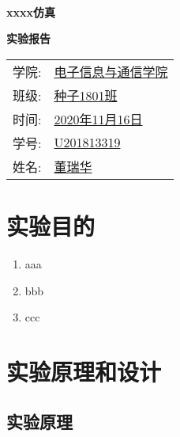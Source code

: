 \documentclass[12pt]{article}
\begin{document}
\pagestyle{empty}
\

{
\vspace{70pt}
\centering\fontsize{24pt}{\baselineskip}\textbf{xxxx仿真}

\vspace{35pt}
\centering\fontsize{32pt}{\baselineskip}\textbf{实验报告}

}

\vspace{155pt}
\begin{table}[htbp]
	\centering
	\begin{tabular}{ll}
        学院:\quad  &\underline{\qquad 电子信息与通信学院\hspace{0.5cm} } \bigskip \\
		班级:\quad  &\underline{\qquad 种子1801班\hspace{1.88cm} } \bigskip \\
        时间:\quad  &\underline{\qquad 2020年11月16日\hspace{0.642cm} } \bigskip \\
        学号:\quad  &\underline{\qquad U201813319\hspace{2.044cm} } \bigskip \\
        姓名:\quad  &\underline{\qquad 董瑞华\hspace{2.975cm} } \bigskip \\
	\end{tabular}
\end{table}
\newpage
\pagestyle{plain}



\section{实验目的}

\begin{enumerate}
	\item aaa
	\item bbb
	\item ccc
\end{enumerate}


\section{实验原理和设计}

\subsection{实验原理}
\end{document}
